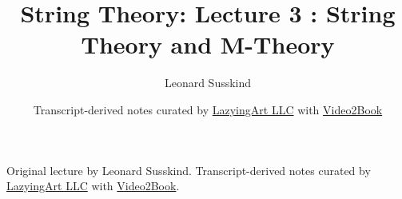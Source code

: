 \documentclass[11pt,oneside]{book}
\begin{document}
\frontmatter
\title{String Theory: Lecture 3 : String Theory and M-Theory}
\author{Leonard Susskind}
\date{Transcript-derived notes curated by \href{https://lazying.art}{LazyingArt LLC} with \href{https://github.com/lachlanchen/Video2Book}{Video2Book}}
\maketitle
\begin{center}
\small Original lecture by Leonard Susskind. Transcript-derived notes curated by \href{https://lazying.art}{LazyingArt LLC} with \href{https://github.com/lachlanchen/Video2Book}{Video2Book}.
\end{center}
\clearpage
\mainmatter

\end{document}
